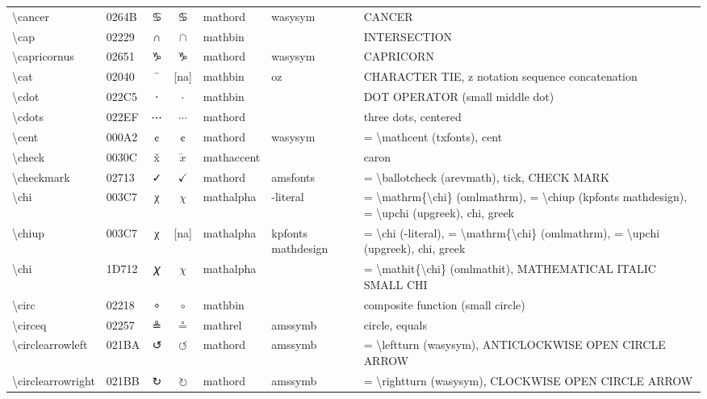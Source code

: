 \documentclass[a4paper,landscape]{article}
\begin{document}
\begin{longtable}{llcclll}
\textbackslash{}cancer & 0264B & \textsf ♋ & $\cancer$ & mathord & wasysym & CANCER \\
\textbackslash{}cap & 02229 & ∩ & $\cap$ & mathbin &  & INTERSECTION \\
\textbackslash{}capricornus & 02651 & \textsf ♑ & $\capricornus$ & mathord & wasysym & CAPRICORN \\
\textbackslash{}cat & 02040 & ⁀ & [na] & mathbin & oz & CHARACTER TIE, z notation sequence concatenation \\
\textbackslash{}cdot & 022C5 & ⋅ & $\cdot$ & mathbin &  & DOT OPERATOR (small middle dot) \\
\textbackslash{}cdots & 022EF & ⋯ & $\cdots$ & mathord &  & three dots, centered \\
\textbackslash{}cent & 000A2 & ¢ & $\cent$ & mathord & wasysym & = \textbackslash{}mathcent (txfonts), cent \\
\textbackslash{}check & 0030C & x̌ & $\check{x}$ & mathaccent &  & caron \\
\textbackslash{}checkmark & 02713 & ✓ & $\checkmark$ & mathord & amsfonts & = \textbackslash{}ballotcheck (arevmath), tick, CHECK MARK \\
\textbackslash{}chi & 003C7 & χ & $\chi$ & mathalpha & -literal & = \textbackslash{}mathrm\{\textbackslash{}chi\} (omlmathrm), = \textbackslash{}chiup (kpfonts mathdesign), = \textbackslash{}upchi (upgreek), chi, greek \\
\textbackslash{}chiup & 003C7 & χ & [na] & mathalpha & kpfonts mathdesign & = \textbackslash{}chi (-literal), = \textbackslash{}mathrm\{\textbackslash{}chi\} (omlmathrm),  = \textbackslash{}upchi (upgreek),  chi,  greek \\
\textbackslash{}chi & 1D712 & 𝜒 & $\chi$ & mathalpha &  & = \textbackslash{}mathit\{\textbackslash{}chi\} (omlmathit), MATHEMATICAL ITALIC SMALL CHI \\
\textbackslash{}circ & 02218 & ∘ & $\circ$ & mathbin &  & composite function (small circle) \\
\textbackslash{}circeq & 02257 & ≗ & $\circeq$ & mathrel & amssymb & circle, equals \\
\textbackslash{}circlearrowleft & 021BA & ↺ & $\circlearrowleft$ & mathord & amssymb & = \textbackslash{}leftturn (wasysym), ANTICLOCKWISE OPEN CIRCLE ARROW \\
\textbackslash{}circlearrowright & 021BB & ↻ & $\circlearrowright$ & mathord & amssymb & = \textbackslash{}rightturn (wasysym), CLOCKWISE OPEN CIRCLE ARROW \\

\end{longtable}
\end{document}
